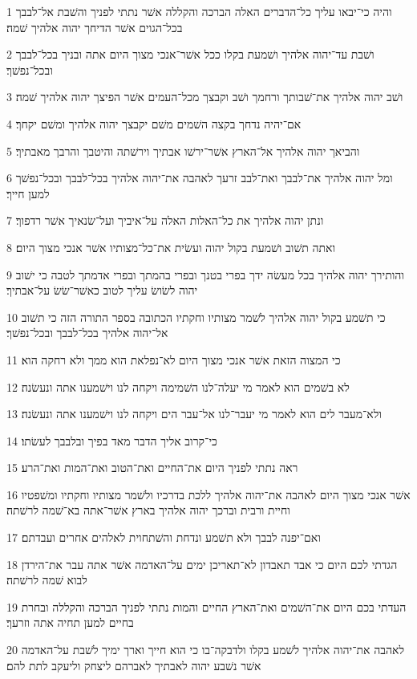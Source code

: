 \par 1 והיה כי־יבאו עליך כל־הדברים האלה הברכה והקללה אשׁר נתתי לפניך והשׁבת אל־לבבך בכל־הגוים אשׁר הדיחך יהוה אלהיך שׁמה׃
\par 2 ושׁבת עד־יהוה אלהיך ושׁמעת בקלו ככל אשׁר־אנכי מצוך היום אתה ובניך בכל־לבבך ובכל־נפשׁך׃
\par 3 ושׁב יהוה אלהיך את־שׁבותך ורחמך ושׁב וקבצך מכל־העמים אשׁר הפיצך יהוה אלהיך שׁמה׃
\par 4 אם־יהיה נדחך בקצה השׁמים משׁם יקבצך יהוה אלהיך ומשׁם יקחך׃
\par 5 והביאך יהוה אלהיך אל־הארץ אשׁר־ירשׁו אבתיך וירשׁתה והיטבך והרבך מאבתיך׃
\par 6 ומל יהוה אלהיך את־לבבך ואת־לבב זרעך לאהבה את־יהוה אלהיך בכל־לבבך ובכל־נפשׁך למען חייך׃
\par 7 ונתן יהוה אלהיך את כל־האלות האלה על־איביך ועל־שׂנאיך אשׁר רדפוך׃
\par 8 ואתה תשׁוב ושׁמעת בקול יהוה ועשׂית את־כל־מצותיו אשׁר אנכי מצוך היום׃
\par 9 והותירך יהוה אלהיך בכל מעשׂה ידך בפרי בטנך ובפרי בהמתך ובפרי אדמתך לטבה כי ישׁוב יהוה לשׂושׂ עליך לטוב כאשׁר־שׂשׂ על־אבתיך׃
\par 10 כי תשׁמע בקול יהוה אלהיך לשׁמר מצותיו וחקתיו הכתובה בספר התורה הזה כי תשׁוב אל־יהוה אלהיך בכל־לבבך ובכל־נפשׁך׃
\par 11 כי המצוה הזאת אשׁר אנכי מצוך היום לא־נפלאת הוא ממך ולא רחקה הוא׃
\par 12 לא בשׁמים הוא לאמר מי יעלה־לנו השׁמימה ויקחה לנו וישׁמענו אתה ונעשׂנה׃
\par 13 ולא־מעבר לים הוא לאמר מי יעבר־לנו אל־עבר הים ויקחה לנו וישׁמענו אתה ונעשׂנה׃
\par 14 כי־קרוב אליך הדבר מאד בפיך ובלבבך לעשׂתו׃
\par 15 ראה נתתי לפניך היום את־החיים ואת־הטוב ואת־המות ואת־הרע׃
\par 16 אשׁר אנכי מצוך היום לאהבה את־יהוה אלהיך ללכת בדרכיו ולשׁמר מצותיו וחקתיו ומשׁפטיו וחיית ורבית וברכך יהוה אלהיך בארץ אשׁר־אתה בא־שׁמה לרשׁתה׃
\par 17 ואם־יפנה לבבך ולא תשׁמע ונדחת והשׁתחוית לאלהים אחרים ועבדתם׃
\par 18 הגדתי לכם היום כי אבד תאבדון לא־תאריכן ימים על־האדמה אשׁר אתה עבר את־הירדן לבוא שׁמה לרשׁתה׃
\par 19 העדתי בכם היום את־השׁמים ואת־הארץ החיים והמות נתתי לפניך הברכה והקללה ובחרת בחיים למען תחיה אתה וזרעך׃
\par 20 לאהבה את־יהוה אלהיך לשׁמע בקלו ולדבקה־בו כי הוא חייך וארך ימיך לשׁבת על־האדמה אשׁר נשׁבע יהוה לאבתיך לאברהם ליצחק וליעקב לתת להם׃

